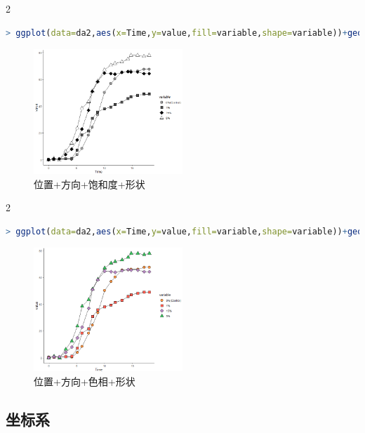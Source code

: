 \documentclass[11pt,a4paper,oneside]{book}
\begin{document}
\begin{multicols}{2}
\begin{lstlisting}[language=r]
> ggplot(data=da2,aes(x=Time,y=value,fill=variable,shape=variable))+geom_line()+geom_point(size=4,color="black")+scale_fill_manual(values = c("grey60","grey30","black","white"))+scale_shape_manual(values = c(21,22,23,24))+theme_classic()
\end{lstlisting}
\begin{figure}[H]
	\centering
	\includegraphics[width=0.5\textwidth]{screenshot029}
	\caption{位置+方向+饱和度+形状}
	\label{fig:screenshot029}
\end{figure}
\end{multicols}
\begin{multicols}{2}
\begin{lstlisting}[language=r]
> ggplot(data=da2,aes(x=Time,y=value,fill=variable,shape=variable))+geom_line()+geom_point(size=4,color="black")+scale_fill_manual(values = c("#FF9641","#FF5B4E","#B887C3","#38C25D"))+scale_shape_manual(values = c(21,22,23,24))+theme_classic()
\end{lstlisting}
\begin{figure}[H]
	\centering
	\includegraphics[width=0.5\textwidth]{screenshot030}
	\caption{位置+方向+色相+形状}
	\label{fig:screenshot030}
\end{figure}
\end{multicols}

\subsection{坐标系}
\end{document}

